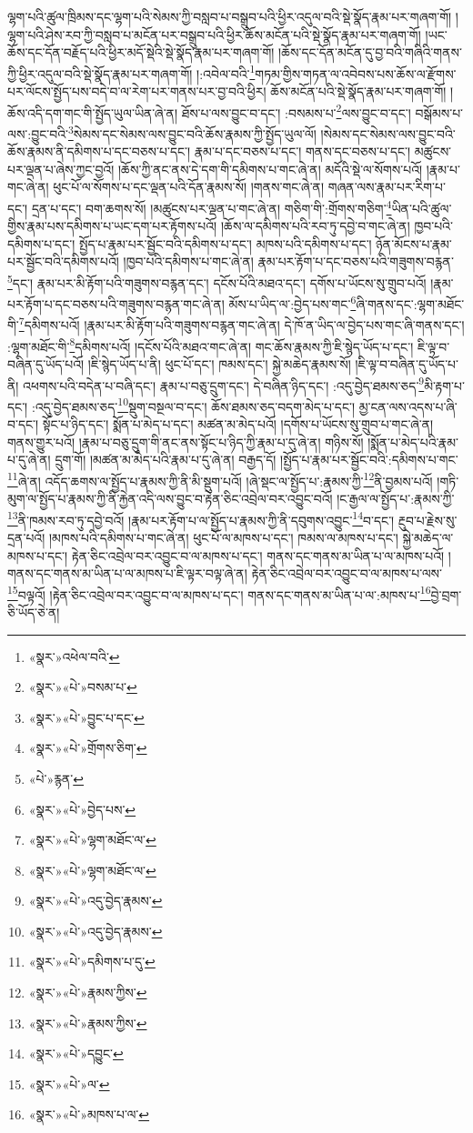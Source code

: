 ལྷག་པའི་ཚུལ་ཁྲིམས་དང་ལྷག་པའི་སེམས་ཀྱི་བསླབ་པ་བསྒྲུབ་པའི་ཕྱིར་འདུལ་བའི་སྡེ་སྣོད་རྣམ་པར་གཞག་གོ། །ལྷག་པའི་ཤེས་རབ་ཀྱི་བསླབ་པ་མངོན་པར་བསྒྲུབ་པའི་ཕྱིར་ཆོས་མངོན་པའི་སྡེ་སྣོད་རྣམ་པར་གཞག་གོ། །ཡང་ཆོས་དང་དོན་བརྗོད་པའི་ཕྱིར་མདོ་སྡེའི་སྡེ་སྣོད་རྣམ་པར་གཞག་གོ། །ཆོས་དང་དོན་མངོན་དུ་བྱ་བའི་གཞིའི་གནས་ཀྱི་ཕྱིར་འདུལ་བའི་སྡེ་སྣོད་རྣམ་པར་གཞག་གོ། །:འབེལ་བའི་\footnote{«སྣར་»འཕེལ་བའི་}གཏམ་གྱིས་གཏན་ལ་འབེབས་པས་ཆོས་ལ་རྫོགས་པར་ལོངས་སྤྱོད་པས་བདེ་བ་ལ་རེག་པར་གནས་པར་བྱ་བའི་ཕྱིར། ཆོས་མངོན་པའི་སྡེ་སྣོད་རྣམ་པར་གཞག་གོ། །ཆོས་འདི་དག་གང་གི་སྤྱོད་ཡུལ་ཡིན་ཞེ་ན། ཐོས་པ་ལས་བྱུང་བ་དང་། :བསམས་པ་\footnote{«སྣར་»«པེ་»བསམ་པ་}ལས་བྱུང་བ་དང་། བསྒོམས་པ་ལས་:བྱུང་བའི་\footnote{«སྣར་»«པེ་»བྱུང་པ་དང་}སེམས་དང་སེམས་ལས་བྱུང་བའི་ཆོས་རྣམས་ཀྱི་སྤྱོད་ཡུལ་ལོ། །སེམས་དང་སེམས་ལས་བྱུང་བའི་ཆོས་རྣམས་ནི་དམིགས་པ་དང་བཅས་པ་དང་། རྣམ་པ་དང་བཅས་པ་དང་། གནས་དང་བཅས་པ་དང་། མཚུངས་པར་ལྡན་པ་ཞེས་ཀྱང་བྱའོ། །ཆོས་ཀྱི་ནང་ནས་དེ་དག་གི་དམིགས་པ་གང་ཞེ་ན། མདོའི་སྡེ་ལ་སོགས་པའོ། །རྣམ་པ་གང་ཞེ་ན། ཕུང་པོ་ལ་སོགས་པ་དང་ལྡན་པའི་དོན་རྣམས་སོ། །གནས་གང་ཞེ་ན། གཞན་ལས་རྣམ་པར་རིག་པ་དང་། དྲན་པ་དང་། བག་ཆགས་སོ། །མཚུངས་པར་ལྡན་པ་གང་ཞེ་ན། གཅིག་གི་:གྲོགས་གཅིག་\footnote{«སྣར་»«པེ་»གྲོགས་ཅིག་}ཡིན་པའི་ཚུལ་གྱིས་རྣམ་པས་དམིགས་པ་ཡང་དག་པར་རྟོགས་པའོ། །ཆོས་ལ་དམིགས་པའི་རབ་ཏུ་དབྱེ་བ་གང་ཞེ་ན། ཁྱབ་པའི་དམིགས་པ་དང་། སྤྱོད་པ་རྣམ་པར་སྦྱོང་བའི་དམིགས་པ་དང་། མཁས་པའི་དམིགས་པ་དང་། ཉོན་མོངས་པ་རྣམ་པར་སྦྱོང་བའི་དམིགས་པའོ། །ཁྱབ་པའི་དམིགས་པ་གང་ཞེ་ན། རྣམ་པར་རྟོག་པ་དང་བཅས་པའི་གཟུགས་བརྙན་\footnote{«པེ་»རྙན་}དང་། རྣམ་པར་མི་རྟོག་པའི་གཟུགས་བརྙན་དང་། དངོས་པོའི་མཐའ་དང་། དགོས་པ་ཡོངས་སུ་གྲུབ་པའོ། །རྣམ་པར་རྟོག་པ་དང་བཅས་པའི་གཟུགས་བརྙན་གང་ཞེ་ན། མོས་པ་ཡིད་ལ་:བྱེད་པས་གང་\footnote{«སྣར་»«པེ་»བྱེད་པས་}ཞི་གནས་དང་:ལྷག་མཐོང་གི་\footnote{«སྣར་»«པེ་»ལྷག་མཐོང་ལ་}དམིགས་པའོ། །རྣམ་པར་མི་རྟོག་པའི་གཟུགས་བརྙན་གང་ཞེ་ན། དེ་ཁོ་ན་ཡིད་ལ་བྱེད་པས་གང་ཞི་གནས་དང་། :ལྷག་མཐོང་གི་\footnote{«སྣར་»«པེ་»ལྷག་མཐོང་ལ་}དམིགས་པའོ། །དངོས་པོའི་མཐའ་གང་ཞེ་ན། གང་ཆོས་རྣམས་ཀྱི་ཇི་སྙེད་ཡོད་པ་དང་། ཇི་ལྟ་བ་བཞིན་དུ་ཡོད་པའོ། །ཇི་སྙེད་ཡོད་པ་ནི། ཕུང་པོ་དང་། ཁམས་དང་། སྐྱེ་མཆེད་རྣམས་སོ། །ཇི་ལྟ་བ་བཞིན་དུ་ཡོད་པ་ནི། འཕགས་པའི་བདེན་པ་བཞི་དང་། རྣམ་པ་བཅུ་དྲུག་དང་། དེ་བཞིན་ཉིད་དང་། :འདུ་བྱེད་ཐམས་ཅད་\footnote{«སྣར་»«པེ་»འདུ་བྱེད་རྣམས་}མི་རྟག་པ་དང་། :འདུ་བྱེད་ཐམས་ཅད་\footnote{«སྣར་»«པེ་»འདུ་བྱེད་རྣམས་}སྡུག་བསྔལ་བ་དང་། ཆོས་ཐམས་ཅད་བདག་མེད་པ་དང་། མྱ་ངན་ལས་འདས་པ་ཞི་བ་དང་། སྟོང་པ་ཉིད་དང་། སྨོན་པ་མེད་པ་དང་། མཚན་མ་མེད་པའོ། །དགོས་པ་ཡོངས་སུ་གྲུབ་པ་གང་ཞེ་ན། གནས་གྱུར་པའོ། །རྣམ་པ་བཅུ་དྲུག་གི་ནང་ནས་སྟོང་པ་ཉིད་ཀྱི་རྣམ་པ་དུ་ཞེ་ན། གཉིས་སོ། །སྨོན་པ་མེད་པའི་རྣམ་པ་དུ་ཞེ་ན། དྲུག་གོ། །མཚན་མ་མེད་པའི་རྣམ་པ་དུ་ཞེ་ན། བརྒྱད་དོ། །སྤྱོད་པ་རྣམ་པར་སྦྱོང་བའི་:དམིགས་པ་གང་\footnote{«སྣར་»«པེ་»དམིགས་པ་དུ་}ཞེ་ན། འདོད་ཆགས་ལ་སྤྱོད་པ་རྣམས་ཀྱི་ནི་མི་སྡུག་པའོ། །ཞེ་སྡང་ལ་སྤྱོད་པ་:རྣམས་ཀྱི་\footnote{«སྣར་»«པེ་»རྣམས་ཀྱིས་}ནི་བྱམས་པའོ། །གཏི་མུག་ལ་སྤྱོད་པ་རྣམས་ཀྱི་ནི་རྐྱེན་འདི་ལས་བྱུང་བ་རྟེན་ཅིང་འབྲེལ་བར་འབྱུང་བའོ། །ང་རྒྱལ་ལ་སྤྱོད་པ་:རྣམས་ཀྱི་\footnote{«སྣར་»«པེ་»རྣམས་ཀྱིས་}ནི་ཁམས་རབ་ཏུ་དབྱེ་བའོ། །རྣམ་པར་རྟོག་པ་ལ་སྤྱོད་པ་རྣམས་ཀྱི་ནི་དབུགས་འབྱུང་\footnote{«སྣར་»«པེ་»དབྱུང་}བ་དང་། རྔུབ་པ་རྗེས་སུ་དྲན་པའོ། །མཁས་པའི་དམིགས་པ་གང་ཞེ་ན། ཕུང་པོ་ལ་མཁས་པ་དང་། ཁམས་ལ་མཁས་པ་དང་། སྐྱེ་མཆེད་ལ་མཁས་པ་དང་། རྟེན་ཅིང་འབྲེལ་བར་འབྱུང་བ་ལ་མཁས་པ་དང་། གནས་དང་གནས་མ་ཡིན་པ་ལ་མཁས་པའོ། །གནས་དང་གནས་མ་ཡིན་པ་ལ་མཁས་པ་ཇི་ལྟར་བལྟ་ཞེ་ན། རྟེན་ཅིང་འབྲེལ་བར་འབྱུང་བ་ལ་མཁས་པ་ལས་\footnote{«སྣར་»«པེ་»ལ་}བལྟའོ། །རྟེན་ཅིང་འབྲེལ་བར་འབྱུང་བ་ལ་མཁས་པ་དང་། གནས་དང་གནས་མ་ཡིན་པ་ལ་:མཁས་པ་\footnote{«སྣར་»«པེ་»མཁས་པ་ལ་}བྱེ་བྲག་ཅི་ཡོད་ཅེ་ན། 